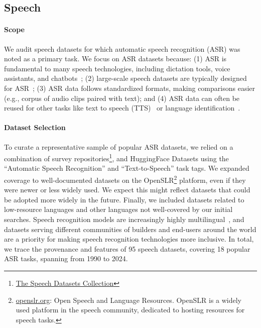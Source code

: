 \vspace{-2mm}
\subsection{Speech}

\vspace{-2mm}
\paragraph{Scope}
We audit speech datasets for which automatic speech recognition (ASR) was noted as a primary task. We focus on ASR datasets because: (1) ASR is fundamental to many speech technologies, including dictation tools, voice assistants, and chatbots~\citep{aksenova-etal-2021-might, Zhang_2022}; (2) large-scale speech datasets are typically designed for ASR~\citep{li2023yodas}; (3) ASR data follows standardized formats, making comparisons easier (e.g., corpus of audio clips paired with text); and (4) ASR data can often be reused for other tasks like text to speech (TTS)~\citep{itoLJSpeechDataset2017} or language identification~\citep{ardila-etal-2020-common}.

\vspace{-2mm}
\paragraph{Dataset Selection}
To curate a representative sample of popular ASR datasets, we relied on a combination of survey repositories\footnote{\href{https://github.com/RevoSpeechTech/speech-datasets-collection}{The Speech Datasets Collection}}, and HuggingFace Datasets using the ``Automatic Speech Recognition'' and ``Text-to-Speech'' task tags.
We expanded coverage to well-documented datasets on the OpenSLR\footnote{\href{https://openslr.org/}{openslr.org}: Open Speech and Language Resources. OpenSLR is a widely used platform in the speech community, dedicated to hosting resources for speech tasks.} platform, even if they were newer or less widely used. We expect this might reflect datasets that could be adopted more widely in the future.
Finally, we included datasets related to low-resource languages and other languages not well-covered by our initial searches. Speech recognition models are increasingly highly multilingual~\cite{babu2021xls,radford2023robust,pratap2024scaling}, and datasets serving different communities of builders and end-users around the world are a priority for making speech recognition technologies more inclusive.
In total, we trace the provenance and features of 95 speech datasets, covering 18 popular ASR tasks, spanning from 1990 to 2024.

